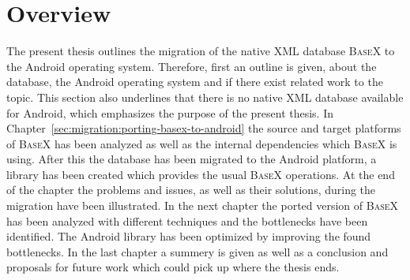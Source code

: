 \section{Overview}
\label{sec:overview}
The present thesis outlines the migration of the native XML database \textsc{BaseX} to the Android operating system.
Therefore, first an outline is given, about the database, the Android operating system and if there exist related work to the topic.
This section also underlines that there is no native XML database available for Android, which emphasizes the purpose of the present thesis.
In Chapter~\ref{sec:migration:porting-basex-to-android} the source and target platforms of \textsc{BaseX} has been analyzed as well as the internal dependencies which \textsc{BaseX} is using.
After this the database has been migrated to the Android platform, a library has been created which provides the usual \textsc{BaseX} operations.
At the end of the chapter the problems and issues, as well as their solutions, during the migration have been illustrated.
In the next chapter the ported version of \textsc{BaseX} has been analyzed with different techniques and the bottlenecks have been identified.
The Android library has been optimized by improving the found bottlenecks.
In the last chapter a summery is given as well as a conclusion and proposals for future work which could pick up where the thesis ends.


